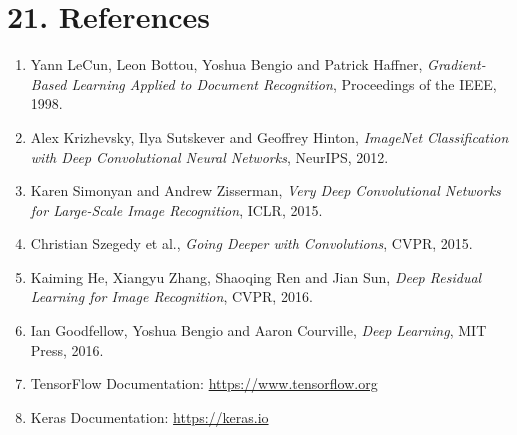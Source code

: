\documentclass[11pt]{article}
\begin{document}

\section*{21. References}

\begin{enumerate}

\item Yann LeCun, Leon Bottou, Yoshua Bengio and Patrick Haffner,
\emph{Gradient-Based Learning Applied to Document Recognition},
Proceedings of the IEEE, 1998.

\item Alex Krizhevsky, Ilya Sutskever and Geoffrey Hinton,
\emph{ImageNet Classification with Deep Convolutional Neural Networks},
NeurIPS, 2012.

\item Karen Simonyan and Andrew Zisserman,
\emph{Very Deep Convolutional Networks for Large-Scale Image Recognition},
ICLR, 2015.

\item Christian Szegedy et al.,
\emph{Going Deeper with Convolutions},
CVPR, 2015.

\item Kaiming He, Xiangyu Zhang, Shaoqing Ren and Jian Sun,
\emph{Deep Residual Learning for Image Recognition},
CVPR, 2016.

\item Ian Goodfellow, Yoshua Bengio and Aaron Courville,
\emph{Deep Learning},
MIT Press, 2016.

\item TensorFlow Documentation:
\url{https://www.tensorflow.org}

\item Keras Documentation:
\url{https://keras.io}

\end{enumerate}

\end{document}
